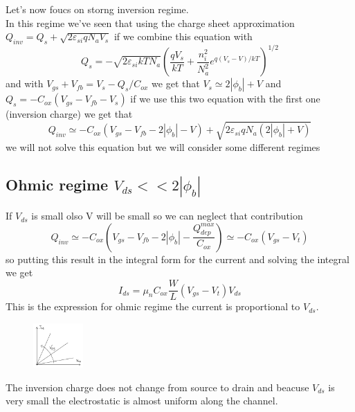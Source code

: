 Let's now foucs on storng inversion regime.\\
In this regime we've seen that using the charge sheet approximation $Q_{inv}=Q_s+\sqrt{2\varepsilon_{si}qN_aV_s}$ if we combine this equation with 
\begin{equation}
Q_s=-\sqrt{2\varepsilon_{si}kTN_a}\left(\frac{qV_s}{kT}+\frac{n_i^2}{N_a^2}e^{q(V_s-V)/kT}\right)^{1/2}
\end{equation}
 and with $V_{gs}+V_{fb}=V_{s}-Q_s/C_{ox}$ we get that $V_s\simeq2|\phi_b|+V$ and $Q_s=-C_{ox}(V_{gs}-V_{fb}-V_{s})$ if we use this two equation with the first one (inversion charge) we get that
\begin{equation}
Q_{inv}\simeq -C_{ox}(V_{gs}-V_{fb}-2|\phi_b|-V)+\sqrt{2\varepsilon_{si}qN_a(2|\phi_b|+V)}
\end{equation}
we will not solve this equation but we will consider some different regimes


\subsection{Ohmic regime $V_{ds}<<2|\phi_b|$}

If $V_{ds}$ is small olso V will be small so we can neglect that contribution 
\begin{equation}
Q_{inv}\simeq -C_{ox}(V_{gs}-V_{fb}-2|\phi_b|-\frac{Q_{dep}^{max}}{C_{ox}})\simeq -C_{ox}(V_{gs}-V_t)
\end{equation}
so putting this result in the integral form for the current and solving the integral we get
\begin{equation}
I_{ds}=\mu_nC_{ox}\frac{W}{L}(V_{gs}-V_t)V_{ds}
\end{equation}
This is the expression for ohmic regime the current is proportional to $V_{ds}$.\\
\begin{figure}
\includegraphics[width=0.17\textwidth]{ohmreg.png}
\end{figure}

The inversion charge does not change from source to drain and beacuse $V_{ds}$ is very small the electrostatic is almost uniform along the channel.\\

